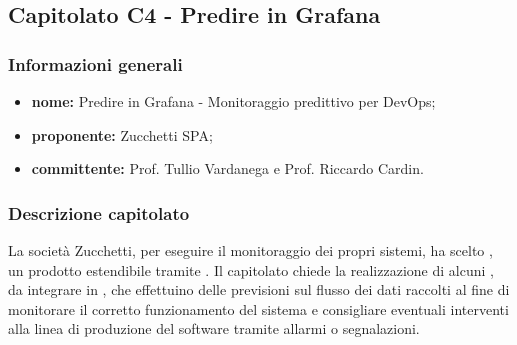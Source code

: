 
\subsection{Capitolato C4 - Predire in Grafana}

		\subsubsection{Informazioni generali}
			\begin{itemize} %
			  	\item \textbf{nome:} Predire in Grafana - Monitoraggio predittivo per DevOps;
			  	\item \textbf{proponente:} Zucchetti SPA;
				\item \textbf{committente:} Prof. Tullio Vardanega e Prof. Riccardo Cardin.
			\end{itemize}

		\subsubsection{Descrizione capitolato}
			La società Zucchetti, per eseguire il monitoraggio dei propri sistemi, ha scelto , un prodotto  estendibile tramite .
			Il capitolato chiede la realizzazione di alcuni , da integrare in , che effettuino delle previsioni sul flusso dei dati raccolti al fine di monitorare il corretto funzionamento del sistema e consigliare eventuali interventi alla linea di produzione del software tramite allarmi o segnalazioni.

